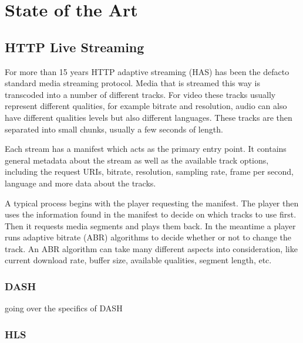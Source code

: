 \chapter{State of the Art\label{cha:chapter2}}

\section{HTTP Live Streaming\label{sec:live}}

For more than 15 years HTTP adaptive streaming (HAS) has been the defacto standard media streaming protocol. Media that is streamed this way is transcoded into a number of different tracks. For video these tracks usually represent different qualities, for example bitrate and resolution, audio can also have different qualities levels but also different languages. These tracks are then separated into small chunks, usually a few seconds of length.

Each stream has a manifest which acts as the primary entry point. It contains general metadata about the stream as well as the available track options, including the request URIs, bitrate, resolution, sampling rate, frame per second, language and more data about the tracks.

A typical process begins with the player requesting the manifest. The player then uses the information found in the manifest to decide on which tracks to use first. Then it requests media segments and plays them back. In the meantime a player runs adaptive bitrate (ABR) algorithms to decide whether or not to change the track. An ABR algorithm can take many different aspects into consideration, like current download rate, buffer size, available qualities, segment length, etc. 



\subsection{DASH\label{sub:dash}}

going over the specifics of DASH

\subsection{HLS\label{sub:hls}}

